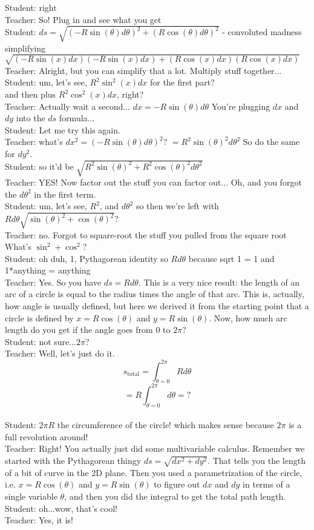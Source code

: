 Student: right\\
Teacher: So! Plug in and see what you get \\
Student: $ds = \sqrt{(-R\sin(\theta)d\theta)^2+(R\cos(\theta)d\theta)^2}$ - convoluted madness
simplifying
$\sqrt{(-R\sin (x)dx)(-R\sin(x)dx)+(R\cos(x)dx)(R\cos(x)dx)}$\\
Teacher: Alright, but you can simplify that a lot. Multiply stuff together...\\
Student: um, let's see, $R^2 \sin^2(x)dx$ for the first part?\\
and then plus $R^2\cos^2(x)dx$, right?\\
Teacher: Actually wait a second... $dx = -R \sin(\theta) d\theta$
You're plugging $dx$ and $dy$ into the $ds$ formula...\\
Student: Let me try this again.\\
Teacher: what's $dx^2 = (-R \sin(\theta) d\theta)^2$? $= R^2 \sin(\theta)^2 d\theta^2$
So do the same for $dy^2$.\\
Student: so it'd be $\sqrt{R^2\sin(\theta)^2+R^2\cos(\theta)^2d\theta^2}$\\
Teacher: YES!
Now factor out the stuff you can factor out...
Oh, and you forgot the $d\theta^2$ in the first term.\\
Student: um, let's see, $R^2$, and $d\theta^2$
so then we're left with $Rd\theta\sqrt{\sin(\theta)^2+\cos(\theta)^2}$?\\
Teacher: no. Forgot to square-root the stuff you pulled from the square root 
What's $\sin^2 + \cos^2$?\\
Student: oh duh, 1, Pythagorean identity
so $Rd\theta$
because sqrt 1 = 1
and 1*anything = anything\\
Teacher: Yes.
So you have $ds = R d\theta$.
This is a very nice result: the length of an arc of a circle is equal to the radius times the angle of that arc.
This is, actually, how angle is usually defined, but here we derived it from the starting point that a circle is defined by $x = R \cos(\theta)$ and $y = R \sin(\theta)$.
Now, how much arc length do you get if the angle goes from 0 to $2\pi$?\\
Student: not sure...$2\pi$?\\
Teacher: Well, let's just do it. $$s_\text{total} = \int_{\theta=0}^{2\pi} R d\theta$$
$$=R \int_{\theta=0}^{2\pi} d \theta = ?$$\\
Student: $2\pi R$
the circumference of the circle!
which makes sense because $2\pi$ is a full revolution around!\\
Teacher: Right! You actually just did some multivariable calculus.
Remember we started with the Pythagorean thingy $ds = \sqrt{dx^2 + dy^2}$.
That tells you the length of a bit of curve in the 2D plane.
Then you used a parametrization of the circle, i.e. $x = R \cos(\theta)$ and $y = R \sin(\theta)$ to figure out $dx$ and $dy$ in terms of a single variable $\theta$, and then you did the integral to get the total path length.\\
Student: oh...wow, that's cool!\\
Teacher: Yes, it is!
